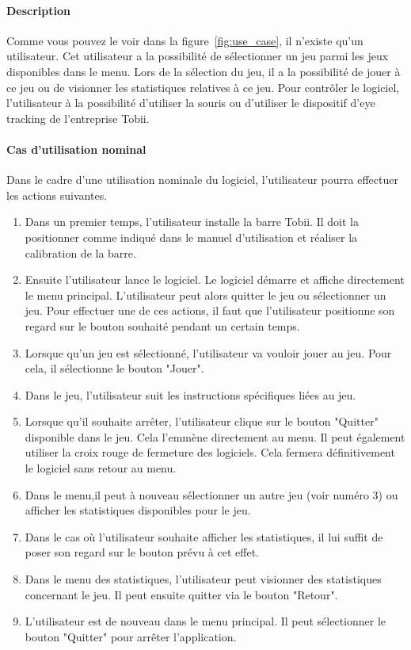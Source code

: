 \documentclass{polytech/polytech}
\begin{document}
\paragraph{Description}
Comme vous pouvez le voir dans la figure~\ref{fig:use_case}, il n'existe qu'un utilisateur. Cet utilisateur a la possibilité de sélectionner un jeu parmi les jeux disponibles dans le menu. Lors de la sélection du jeu, il a la possibilité de jouer à ce jeu ou de visionner les statistiques relatives à ce jeu. Pour contrôler le logiciel, l'utilisateur à la possibilité d'utiliser la souris ou d'utiliser le dispositif d'eye tracking de l'entreprise Tobii. 

\paragraph{Cas d'utilisation nominal}
Dans le cadre d'une utilisation nominale du logiciel, l'utilisateur pourra effectuer les actions suivantes.

\begin{enumerate}
\item Dans un premier temps, l'utilisateur installe la barre Tobii. Il doit la positionner comme indiqué dans le manuel d'utilisation et réaliser la calibration de la barre.
\item Ensuite l'utilisateur lance le logiciel. Le logiciel démarre et affiche directement le menu principal. L'utilisateur peut alors quitter le jeu ou sélectionner un jeu. Pour effectuer une de ces actions, il faut que l'utilisateur positionne son regard sur le bouton souhaité pendant un certain temps.
\item Lorsque qu'un jeu est sélectionné, l'utilisateur va vouloir  jouer au jeu. Pour cela, il sélectionne le bouton "Jouer".
\item Dans le jeu, l'utilisateur suit les instructions spécifiques liées au jeu.
\item Lorsque qu'il souhaite arrêter, l'utilisateur clique sur le bouton "Quitter" disponible dans le jeu. Cela l'emmène directement au menu. Il peut également utiliser la croix rouge de fermeture des logiciels. Cela fermera définitivement le logiciel sans retour au menu.
\item Dans le menu,il peut à nouveau sélectionner un autre jeu (voir numéro 3) ou afficher les statistiques disponibles pour le jeu.
\item Dans le cas où l'utilisateur souhaite afficher les statistiques, il lui suffit de poser son regard sur le bouton prévu à cet effet.
\item Dans le menu des statistiques, l'utilisateur peut visionner des statistiques concernant le jeu. Il peut ensuite quitter via le bouton "Retour".
\item L'utilisateur est de nouveau dans le menu principal. Il peut sélectionner le bouton "Quitter" pour arrêter l'application.
\end{enumerate}
\end{document}
